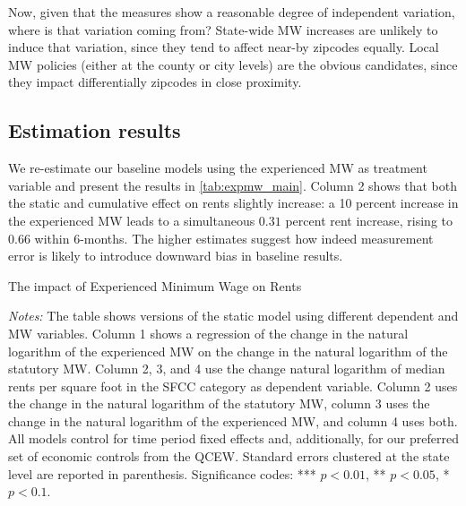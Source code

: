 Now, given that the measures show a reasonable degree of independent variation, where is that
variation coming from? State-wide MW increases are unlikely to induce that variation, since 
they tend to affect near-by zipcodes equally. Local MW policies (either at the county or city
levels) are the obvious candidates, since they impact differentially zipcodes in close 
proximity. 

\subsection{Estimation results}

We re-estimate our baseline models using the experienced MW as treatment variable and present 
the results in \autoref{tab:expmw_main}. Column 2 shows that both the static and cumulative 
effect on rents slightly increase: a 10 percent increase in the experienced MW leads to a simultaneous
$0.31$ percent rent increase, rising to $0.66$ within 6-months. The higher estimates suggest how 
indeed measurement error is likely to introduce downward bias in baseline results.



\begin{table}[h!]\centering
	\caption{The impact of Experienced Minimum Wage on Rents}
	\label{tab:expmw_main}
	
	\begin{minipage}{0.95\textwidth}\footnotesize
		\vspace{3mm}	
		\textit{Notes:} The table shows versions of the static model using different dependent and 
		MW variables. Column 1 shows a regression of the change in the natural logarithm of the 
		experienced MW on the change in the natural logarithm of the statutory MW. Column 2, 3, and 4
		use the change natural logarithm of median rents per square foot in the SFCC category as 
		dependent variable. Column 2 uses the change in the natural logarithm of the statutory MW, 
		column 3 uses the change in the natural logarithm of the experienced MW, and column 4 uses both.
		All models control for time period fixed effects and, additionally, for our preferred set of 
		economic controls from the QCEW. 
		Standard errors clustered at the state level are reported in parenthesis. Significance codes: 
		*** $p < 0.01$, ** $p < 0.05$, * $p < 0.1$.
	\end{minipage}
\end{table}



